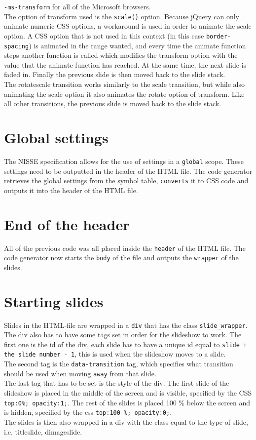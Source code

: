 \texttt{-ms-transform} for all of the Microsoft browsers. \\
The option of transform used is the \texttt{scale()} option. Because jQuery can only animate numeric CSS options, a workaround is used in order to animate the scale option. A CSS option that is not used in this context (in this case \texttt{border-spacing}) is animated in the range wanted, and every time the animate function steps another function is called which modifies the transform option with the value that the animate function has reached. At the same time, the next slide is faded in. Finally the previous slide is then moved back to the slide stack. \\
The rotatescale transition works similarly to the scale transition, but while also animating the scale option it also animates the rotate option of transform. Like all other transitions, the previous slide is moved back to the slide stack.

\section{Global settings}
The NISSE specification allows for the use of settings in a \texttt{global} scope. These settings need to be outputted in the header of the HTML file. The code generator retrieves the global settings from the symbol table, \texttt{converts} it to CSS code and outputs it into the header of the HTML file.

\section{End of the header}
All of the previous code was all placed inside the \texttt{header} of the HTML file. The code generator now starts the \texttt{body} of the file and outputs the \texttt{wrapper} of the slides.

\section{Starting slides}
Slides in the HTML-file are wrapped in a \texttt{div} that has the class \texttt{slide\_wrapper}. The div also has to have some tags set in order for the slideshow to work. The first one is the id of the div, each slide has to have a unique id equal to \texttt{slide + the slide number - 1}, this is used when the slideshow moves to a slide. \\
The second tag is the \texttt{data-transition} tag, which specifies what transition should be used when moving \texttt{away} from that slide. \\
The last tag that has to be set is the style of the div. The first slide of the slideshow is placed in the middle of the screen and is visible, specified by the CSS \texttt{top:0\%; opacity:1;}. The rest of the slides is placed 100 \% below the screen and is hidden, specified by the css \texttt{top:100 \%; opacity:0;}. \\
The slides is then also wrapped in a div with the class equal to the type of slide, i.e. titleslide, dimageslide.

